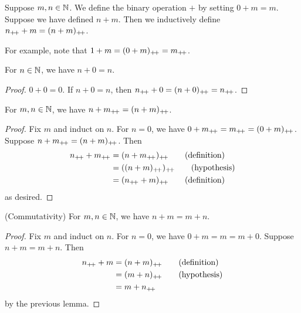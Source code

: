 
\begin{definition}[Addition] \label{def:N:addition}
    Suppose $m, n \in \mathbb{N}$.
    We define the binary operation $+$ by setting $0 + m = m$.
    Suppose we have defined $n + m$.
    Then we inductively define $n_{+\!+} + m = (n + m)_{+\!+}$.
\end{definition}
For example, note that $1 + m = (0 + m)_{+\!+} = m_{+\!+}$.

\begin{lemma} \label{thm:N:add_zero}
    For $n \in \mathbb{N}$, we have $n + 0 = n$.
\end{lemma}
\begin{proof}
    $0 + 0 = 0$.
    If $n + 0 = n$, then $n_{+\!+} + 0 = (n + 0)_{+\!+} = n_{+\!+}$.
\end{proof}

\begin{lemma} \label{thm:N:add_successor}
    For $m, n \in \mathbb{N}$, we have $n + m_{+\!+} = (n + m)_{+\!+}$.
\end{lemma}
\begin{proof}
    Fix $m$ and induct on $n$.
    For $n = 0$, we have $0 + m_{+\!+} = m_{+\!+} = (0 + m)_{+\!+}$.
    Suppose $n + m_{+\!+} = (n + m)_{+\!+}$.
    Then \begin{align*}
        n\pp + m\pp &= (n + m\pp)\pp \tag{definition} \\
                    &= ((n + m)\pp)\pp \tag{hypothesis} \\
                    &= (n\pp + m)\pp \tag{definition}
    \end{align*}
    as desired.
\end{proof}

\begin{exercise} \label{prb:N:add_commute}
    (Commutativity) For $m, n \in \mathbb{N}$, we have $n + m = m + n$.
\end{exercise}
\begin{proof}
    Fix $m$ and induct on $n$.
    For $n = 0$, we have $0 + m = m = m + 0$.
    Suppose $n + m = m + n$.
    Then \begin{align*}
        n_{+\!+} + m &= (n + m)_{+\!+} \tag{definition} \\
                 &= (m + n)_{+\!+} \tag{hypothesis} \\
                 &= m + n_{+\!+}
    \end{align*}
    by the previous lemma.
\end{proof}


